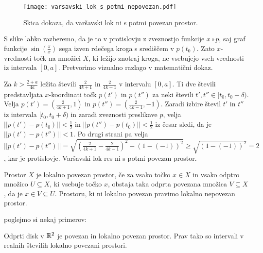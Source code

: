 \documentclass[../TG_magistrsko_delo_sections.tex]{subfiles}
\begin{document}
\begin{figure}[h]
  \centering
  \texttt{[image: varsavski\_lok\_s\_potmi\_nepovezan.pdf]}
  \caption[Primer vektorske slike.]{Skica dokaza, da varšavski lok ni s potmi povezan prostor.}
  \label{fig:varsavski_lok}
\end{figure}

S slike lahko razberemo, da je to v protislovju z zveznostjo funkcije $x \circ p$, saj graf funkcije $\sin\left(\frac{\pi}{x}\right)$ sega izven rdečega kroga s središčem v $p(t_0)$. Zato $x$-vrednosti točk na množici $X$, ki ležijo znotraj kroga, ne vsebujejo vseh vrednosti iz intervala $[0, a]$. Pretvorimo vizualno razlago v matematični dokaz.

Za $k > \frac{2+a}{4a}$ ležita števili $\frac{2}{4k+1}$ in $\frac{2}{4k-1}$ v intervalu $[0, a]$. Ti dve števili predstavljata $x$-koordinati točk $p(t')$ in $p(t'')$ za neki števili $t', t'' \in [t_0, t_0 + \delta)$. Velja $p(t') = (\frac{2}{4k+1}, 1)$ in $p(t'') = (\frac{2}{4k-1}, -1)$. Zaradi izbire števil $t'$ in $t''$ iz intervala $[t_0, t_0 + \delta)$ in zaradi zveznosti preslikave $p$, velja $||p(t') - p(t_0)||< \frac{1}{2}$ in $||p(t'') - p(t_0)||< \frac{1}{2}$ iz česar sledi, da je $||p(t') - p(t'')||< 1$. Po drugi strani pa velja $||p(t') - p(t'')|| = \sqrt{\left(\frac{2}{4k+1}-\frac{2}{4k-1}\right)^2 + (1-(-1))^2} \geq \sqrt{(1-(-1))^2} = 2$, kar je protislovje. Varšavski lok res ni s potmi povezan prostor.


\begin{definicija}
Prostor $X$ je lokalno povezan prostor, če za vsako točko $x \in X$ in vsako odptro množico $U \subseteq X$, ki vsebuje točko $x$, obstaja taka odprta povezana množica $V \subseteq X$, da je $x \in V \subseteq U$. Prostoru, ki ni lokalno povezan pravimo lokalno nepovezan prostor.
\end{definicija}

poglejmo si nekaj primerov:
\begin{primer}
Odprti disk v $\mathbb R^2$ je povezan in lokalno povezan prostor. Prav tako so intervali v realnih številih lokalno povezani prostori.
\end{primer}
\end{document}
